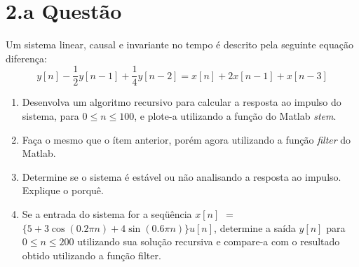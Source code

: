 \section*{2.a Questão}
\label{sec:q2}

Um sistema linear, causal e invariante no tempo é descrito pela seguinte equação 
diferença:
$$
y[n] - \dfrac{1}{2}y[n - 1] + \dfrac{1}{4}y[n - 2] = x[n] + 2x[n - 1] + x[n - 3]
$$

\begin{enumerate}
  \item Desenvolva um algoritmo recursivo para calcular a resposta ao impulso do
    sistema, para $0 \leq n \leq 100$, e plote-a utilizando a função do Matlab
    \emph{stem}.
  \item Faça o mesmo que o ítem anterior, porém agora utilizando a função
    \emph{filter} do Matlab.
  \item Determine se o sistema é estável ou não analisando a resposta ao impulso.
    Explique o porquê.
  \item Se a entrada do sistema for a seqüência
    $x[n]$ $=$ $\{5 + 3\cos(0.2\pi n) + 4\sin(0.6\pi n)\} u[n]$, determine a saída $y[n]$
    para $0 \leq n \leq 200$ utilizando sua solução recursiva e compare-a com o
    resultado obtido utilizando a função filter.
\end{enumerate}

